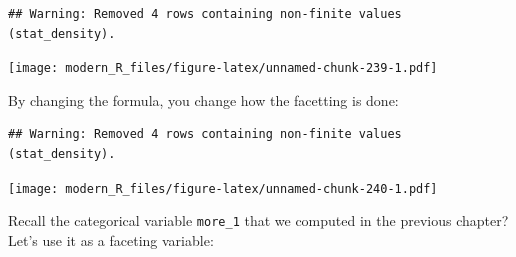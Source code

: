 \documentclass[]{gitbook}
\newenvironment{Shaded}{\begin{snugshade}}{\end{snugshade}}
\newcommand{\DataTypeTok}[1]{\textcolor[rgb]{0.13,0.29,0.53}{#1}}
\newcommand{\KeywordTok}[1]{\textcolor[rgb]{0.13,0.29,0.53}{\textbf{#1}}}
\newcommand{\NormalTok}[1]{#1}
\newcommand{\OperatorTok}[1]{\textcolor[rgb]{0.81,0.36,0.00}{\textbf{#1}}}
\newcommand{\StringTok}[1]{\textcolor[rgb]{0.31,0.60,0.02}{#1}}
\theoremstyle{definition}
\theoremstyle{definition}
\theoremstyle{definition}
\theoremstyle{remark}
\begin{document}
\begin{verbatim}
## Warning: Removed 4 rows containing non-finite values (stat_density).
\end{verbatim}

\texttt{[image: modern\_R\_files/figure-latex/unnamed-chunk-239-1.pdf]}

By changing the formula, you change how the facetting is done:

\begin{Shaded}
\end{Shaded}

\begin{verbatim}
## Warning: Removed 4 rows containing non-finite values (stat_density).
\end{verbatim}

\texttt{[image: modern\_R\_files/figure-latex/unnamed-chunk-240-1.pdf]}

Recall the categorical variable \texttt{more\_1} that we computed in the
previous chapter? Let's use it as a faceting variable:
\end{document}
